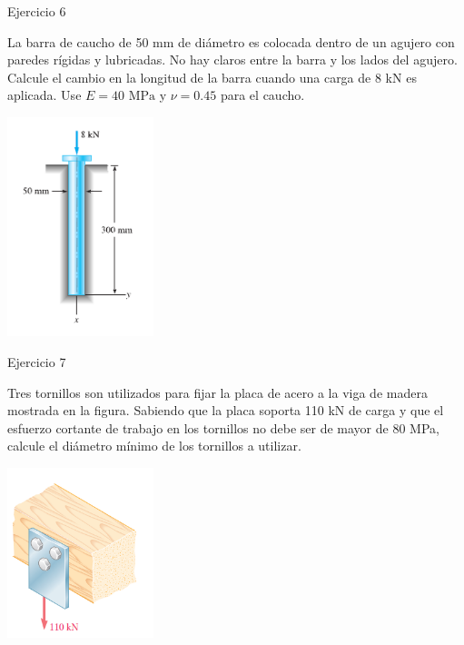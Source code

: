 \documentclass[12pt,letterpaper]{article}
\begin{document}
\begin{ejemplo}{Ejercicio 6}

La barra de caucho de 50 mm de diámetro es colocada dentro de un agujero con paredes rígidas y lubricadas. 
No hay claros entre la barra y los lados del agujero. Calcule el cambio en la longitud de la barra cuando 
una carga de 8 kN es aplicada. Use $E=40 \text{ MPa}$ y $\nu = 0.45$ para el caucho.

\begin{center}
\includegraphics[width=0.32\textwidth]{img/p06.PNG}
\end{center}

\end{ejemplo}


\begin{ejemplo}{Ejercicio 7}

Tres tornillos son utilizados para fijar la placa de acero a la viga de madera 
mostrada en la figura. Sabiendo que la placa soporta 110 kN de carga y que el 
esfuerzo cortante de trabajo en los tornillos no debe ser de mayor de 80 MPa, 
calcule el diámetro mínimo de los tornillos a utilizar.

\begin{center}
\includegraphics[width=0.32\textwidth]{img/p07.PNG}
\end{center}

\end{ejemplo}
\end{document}
